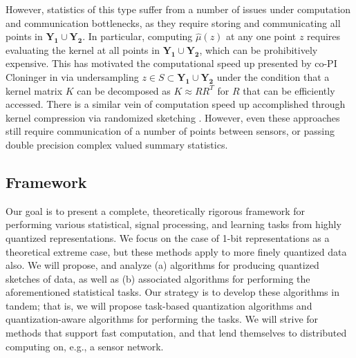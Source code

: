 However, statistics of this type suffer from a number of issues under computation and communication bottlenecks, as they require storing and communicating all points in $\mathbf{Y_1}\cup \mathbf{Y_2}$.  In particular, computing $\hat{\mu}(z)$ at any one point $z$ requires evaluating the kernel at all points in $\mathbf{Y_1}\cup \mathbf{Y_2}$, which can be prohibitively expensive.
This has motivated the computational speed up presented by co-PI Cloninger in \cite{cheng2017two} via undersampling $z\in S\subset \mathbf{Y_1}\cup \mathbf{Y_2}$ under the condition that a kernel matrix $K$ can be decomposed as $K\approx RR^T$ for $R$ that can be efficiently accessed.  There is a similar vein of computation speed up accomplished through kernel compression via randomized sketching \cite{gribonval2017compressive}.  However, even these approaches still require communication of a number of points between sensors, or passing double precision complex valued summary statistics.  







\subsection{Framework}%
 Our goal  is to present a complete, theoretically rigorous framework for performing various statistical, signal processing, and learning tasks from highly quantized representations. We focus on the case of 1-bit representations as a theoretical extreme case, but these methods apply to more finely quantized data also. We will propose, and analyze  (a) algorithms for  producing quantized sketches of data, as well as (b) associated algorithms for performing the aforementioned statistical tasks. Our strategy is to develop these algorithms in tandem; that is, we will propose task-based quantization algorithms and quantization-aware algorithms for performing the tasks. We will strive for methods that support fast computation, and that lend themselves to distributed computing on, e.g., a sensor network.
  
